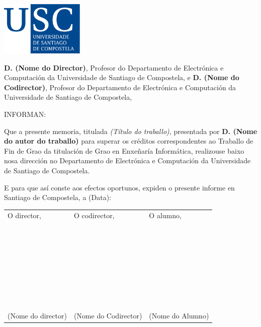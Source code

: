 \pagestyle{plain}
\includegraphics[width=4cm]{figuras/logo_usc.eps}

\vspace{1cm}
{\bf D. (Nome do Director)}, Profesor do Departamento de Electrónica e Computación da Universidade de Santiago de Compostela, e {\bf D. (Nome do Codirector)}, Profesor do Departamento de Electrónica e Computación da Universidade de Santiago de Compostela,

\vspace{1cm}
INFORMAN:

\vspace{1cm}
Que a presente memoria, titulada {\it (Título do traballo)}, presentada por {\bf D. (Nome do autor do traballo)} para superar os créditos correspondentes ao Traballo de Fin de Grao da titulación de Grao en Enxeñaría Informática, realizouse baixo nosa dirección no Departamento de Electrónica e Computación da Universidade de Santiago de Compostela.

\vspace{1cm}
E para que así conste aos efectos oportunos, expiden o presente informe en Santiago de Compostela, a (Data):

\vspace{2cm}
\begin{tabular}{lll}
O director, & O codirector, & O alumno, \\
~ \\
~ \\
~ \\
~ \\
~ \\
~ \\
~ \\
(Nome do director) & (Nome do Codirector) & (Nome do Alumno)
\end{tabular}

